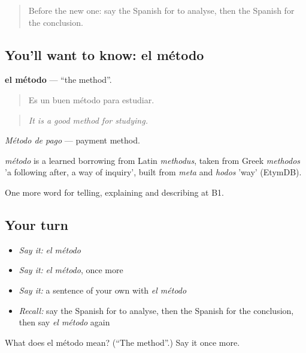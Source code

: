 \label{lesson:ES-C599-metodo}



\begin{quote}
Before the new one: say the Spanish for to analyse, then the Spanish for the conclusion.
\end{quote}

\subsection*{You'll want to know: el método}
\textbf{el método} — \textquotedblleft{}the method\textquotedblright{}.

\begin{quote}
Es un buen método para estudiar.
\end{quote}

\begin{quote}
\emph{It is a good method for studying.}
\end{quote}

\emph{Método de pago} — payment method.

\begin{cousinweb}
\emph{método} is a learned borrowing from Latin \emph{methodus}, taken from Greek \emph{methodos} 'a following after, a way of inquiry', built from \emph{meta} and \emph{hodos} 'way' (EtymDB).
\end{cousinweb}

\begin{grammarlens}[title={What you've built}]
One more word for telling, explaining and describing at B1.
\end{grammarlens}

\subsection*{Your turn}
\begin{itemize}
\raggedright
  \item \emph{Say it:} \emph{el método}
  \item \emph{Say it:} \emph{el método}, once more
  \item \emph{Say it:} a sentence of your own with \emph{el método}
  \item \emph{Recall:} say the Spanish for to analyse, then the Spanish for the conclusion, then say \emph{el método} again
\end{itemize}

\begin{tcolorbox}[breakable,colback=teal!4,colframe=teal!35!black,title={Before you move on}]
What does el método mean? (\textquotedblleft{}The method\textquotedblright{}.) Say it once more.
\end{tcolorbox}
